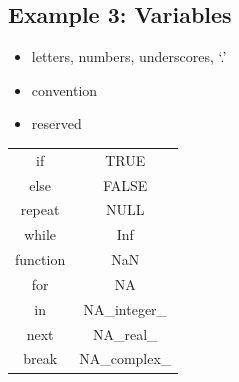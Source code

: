 \documentclass[10pt,letterpaper]{article}
\begin{document}
\subsection{Example 3: Variables} %
\label{sub:example_3_variables}
\begin{itemize}
    \item letters, numbers, underscores, `.'
    \item convention
    \item reserved
\end{itemize}
\begin{center}
    \begin{tabular}{c|c}
        if & TRUE \\
        else & FALSE \\
        repeat & NULL \\
        while & Inf \\
        function & NaN \\
        for & NA \\
        in & NA\_integer\_ \\
        next & NA\_real\_ \\
        break & NA\_complex\_ \\
    \end{tabular}
\end{center}
\end{document}
